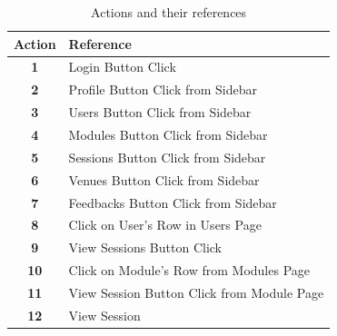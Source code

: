 \begin{justify}
    \renewcommand{\arraystretch}{0.8}
    \begin{table}[H]
        \centering
        \caption{Actions and their references}
        \begin{tabular}{|c|l|}
        \hline
        \rowcolor[rgb]{0.906,0.859,0.906} \textbf{ Action } & \textbf{ Reference }                                             \\
        \hline
        \textbf{ 1 }                                        & Login Button
          Click                                             \\
        \hline
        \textbf{ 2 }                                        & Profile
          Button Click from Sidebar                              \\
        \hline
        \textbf{ 3 }                                        & Users Button
          Click from Sidebar                                \\
        \hline
        \textbf{ 4 }                                        & Modules
          Button Click from Sidebar                              \\
        \hline
        \textbf{ 5 }                                        & Sessions
          Button Click from Sidebar                             \\
        \hline
        \textbf{ 6 }                                        & Venues Button
          Click from Sidebar                               \\
        \hline
        \textbf{ 7 }                                        & Feedbacks
          Button Click from Sidebar                            \\
        \hline
        \textbf{ 8 }                                        & Click on
          User’s Row in Users Page                              \\
        \hline
        \textbf{ 9 }                                        & View Sessions
          Button Click                                     \\
        \hline
        \textbf{ 10 }                                       & Click on
          Module’s Row from Modules Page                        \\
        \hline
        \textbf{ 11 }                                       & View Session
          Button Click from Module Page                     \\
        \hline
        \textbf{ 12 }                                       & View Session

\end{tabular}
\end{table}
\end{justify}

